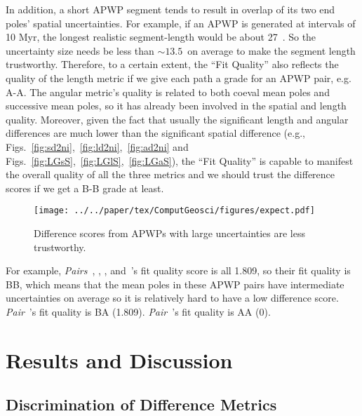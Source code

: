 In addition, a short APWP segment tends to result in overlap of its two end
poles' spatial uncertainties. For example, if an APWP is generated at intervals
of 10 Myr, the longest realistic segment-length would be about
27\degree~\cite[the maximum rate of plate movement is about 30 cm/yr]{S09,K14}.
So the uncertainty size needs be less than ${\sim}13.5$\degree\ on average to
make the segment length trustworthy. Therefore, to a certain extent, the ``Fit
Quality'' also reflects the quality of the length metric if we give each path a
grade for an APWP pair, e.g. A-A. The angular metric’s quality is related to
both coeval mean poles and successive mean poles, so it has already been
involved in the spatial and length quality. Moreover, given the fact that
usually the significant length and angular differences are much lower than
the significant spatial difference (e.g.,
Figs.~\ref{fig:sd2ni},~\ref{fig:ld2ni},~\ref{fig:ad2ni} and
Figs.~\ref{fig:LGsS},~\ref{fig:LGlS},~\ref{fig:LGaS}), the ``Fit Quality'' is
capable to manifest the overall quality of all the three metrics and we should
trust the difference scores if we get a B-B grade at least.

\begin{figure}[tbp]
\texttt{[image: ../../paper/tex/ComputGeosci/figures/expect.pdf]}
\caption[]{Difference scores from APWPs with large uncertainties are less
trustworthy.}\label{fig:FitQ}
\end{figure}

For example, \emph{Pairs}~\textbf{},
\textbf{}, \textbf{},
\textbf{} and~\textbf{}'s fit quality
score is all 1.809, so their fit quality is B\textendash{}B,
which means that the mean poles in these APWP pairs have intermediate
uncertainties on average so it is relatively hard to have a low difference
score. \emph{Pair}~\textbf{}'s fit quality is B\textendash{}A
(1.809). \emph{Pair}~\textbf{}'s fit quality
is A\textendash{}A (0).

\section{Results and Discussion}

\subsection{Discrimination of Difference Metrics}

